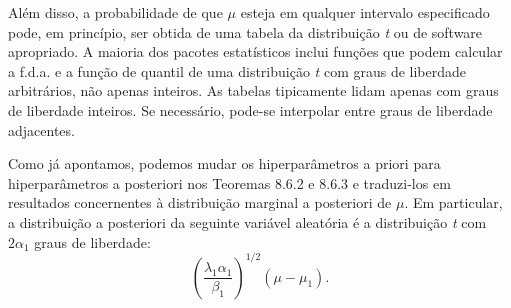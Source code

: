 \vspace{1em}
Além disso, a probabilidade de que $\mu$ esteja em qualquer intervalo especificado pode, em princípio, ser obtida de uma tabela da distribuição \textit{t} ou de software apropriado. A maioria dos pacotes estatísticos inclui funções que podem calcular a f.d.a. e a função de quantil de uma distribuição \textit{t} com graus de liberdade arbitrários, não apenas inteiros. As tabelas tipicamente lidam apenas com graus de liberdade inteiros. Se necessário, pode-se interpolar entre graus de liberdade adjacentes.

Como já apontamos, podemos mudar os hiperparâmetros a priori para hiperparâmetros a posteriori nos Teoremas 8.6.2 e 8.6.3 e traduzi-los em resultados concernentes à distribuição marginal a posteriori de $\mu$. Em particular, a distribuição a posteriori da seguinte variável aleatória é a distribuição \textit{t} com $2\alpha_1$ graus de liberdade:
\begin{equation} \label{eq:8.6.12}
    \left(\frac{\lambda_1\alpha_1}{\beta_1}\right)^{1/2}(\mu - \mu_1).
\end{equation}

